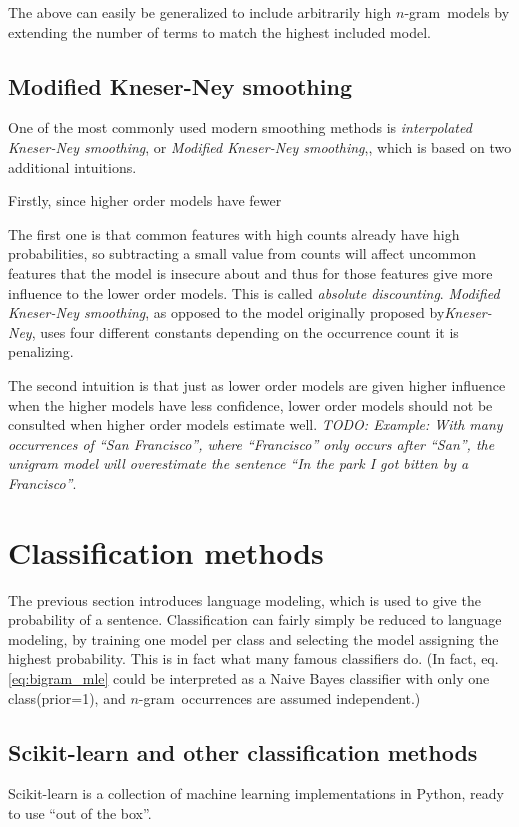 \documentclass[a4paper,11pt]{kth-mag}
\newcommand{\ngram}{$n$-gram}
\begin{document}
The above can easily be generalized to include arbitrarily high \ngram~models by extending the number of terms to match the highest included model.

\subsection{Modified Kneser-Ney smoothing}
One of the most commonly used modern smoothing methods is \emph{interpolated Kneser-Ney smoothing}, or \emph{Modified Kneser-Ney smoothing},\cite{nlp_book}, which is based on two additional intuitions.

Firstly, since higher order models have fewer

The first one is that common features with high counts already have high probabilities, so subtracting a small value from counts will affect uncommon features that the model is insecure about and thus for those features give more influence to the lower order models. This is called \emph{absolute discounting}\cite{npl_book}. \emph{Modified Kneser-Ney smoothing}, as opposed to the model originally proposed by\emph{Kneser-Ney}, uses four different constants depending on the occurrence count it is penalizing.

The second intuition is that just as lower order models are given higher influence when the higher models have less confidence, lower order models should not be consulted when higher order models estimate well. \emph{TODO: Example: With many occurrences of  ``San Francisco'', where ``Francisco'' only occurs after ``San'', the unigram model will overestimate the sentence ``In the park I got bitten by a Francisco''}.

\section{Classification methods}
The previous section introduces language modeling, which is used to give the probability of a sentence. Classification can fairly simply be reduced to language modeling, by training one model per class and selecting the model assigning the highest probability. This is in fact what many famous classifiers do. (In fact, eq. \ref {eq:bigram_mle} could be interpreted as a Naive Bayes classifier with only one class(prior=1), and \ngram~occurrences are assumed independent.)

\subsection{Scikit-learn and other classification methods}
Scikit-learn\cite{scikit-learn} is a collection of machine learning implementations in Python, ready to use ``out of the box''.
\end{document}
